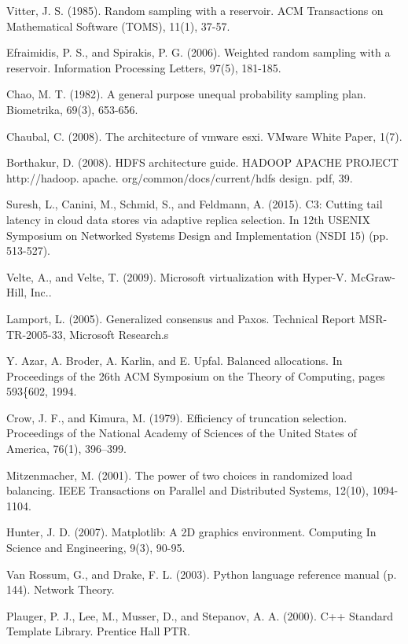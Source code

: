 \documentclass[12pt]{article}
\begin{document}
\begin{thebibliography}{99}
    Vitter, J. S. (1985). Random sampling with a reservoir. ACM Transactions on Mathematical Software (TOMS), 11(1), 37-57.

    Efraimidis, P. S., and Spirakis, P. G. (2006). Weighted random sampling with a reservoir. Information Processing Letters, 97(5), 181-185.

    Chao, M. T. (1982). A general purpose unequal probability sampling plan.  Biometrika, 69(3), 653-656.

    Chaubal, C. (2008). The architecture of vmware esxi. VMware White Paper, 1(7).

    Borthakur, D. (2008). HDFS architecture guide. HADOOP APACHE PROJECT http://hadoop. apache. org/common/docs/current/hdfs design. pdf, 39.

    Suresh, L., Canini, M., Schmid, S., and Feldmann, A. (2015). C3: Cutting tail latency in cloud data stores via adaptive replica selection. In 12th USENIX Symposium on Networked Systems Design and Implementation (NSDI 15) (pp. 513-527).

    Velte, A., and Velte, T. (2009). Microsoft virtualization with Hyper-V. McGraw-Hill, Inc..

    Lamport, L. (2005). Generalized consensus and Paxos. Technical Report MSR-TR-2005-33, Microsoft Research.s

    Y. Azar, A. Broder, A. Karlin, and E. Upfal. Balanced allocations. In Proceedings of the 26th ACM Symposium on the Theory of Computing, pages 593\{602, 1994.

    Crow, J. F., and Kimura, M. (1979). Efficiency of truncation selection. Proceedings of the National Academy of Sciences of the United States of America, 76(1), 396–399.

    Mitzenmacher, M. (2001). The power of two choices in randomized load balancing. IEEE Transactions on Parallel and Distributed Systems, 12(10), 1094-1104.

    Hunter, J. D. (2007). Matplotlib: A 2D graphics environment. Computing In Science and Engineering, 9(3), 90-95.

    Van Rossum, G., and Drake, F. L. (2003). Python language reference manual (p. 144). Network Theory.

    Plauger, P. J., Lee, M., Musser, D., and Stepanov, A. A. (2000). C++ Standard Template Library. Prentice Hall PTR.

 \end{thebibliography}
\end{document}
